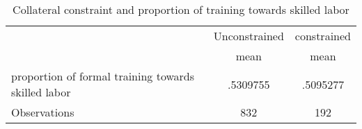 \begin{table}[htbp]\centering
\def\sym#1{\ifmmode^{#1}\else\(^{#1}\)\fi}
\caption{Collateral constraint and proportion of training towards skilled labor}
\begin{tabular}{l*{2}{c}}
\toprule
                    &\multicolumn{1}{c}{Unconstrained}&\multicolumn{1}{c}{constrained}\\
                    &        mean&        mean\\
\midrule
proportion of formal training towards skilled labor&    .5309755&    .5095277\\
\midrule
Observations        &         832&         192\\
\bottomrule
\end{tabular}
\end{table}
